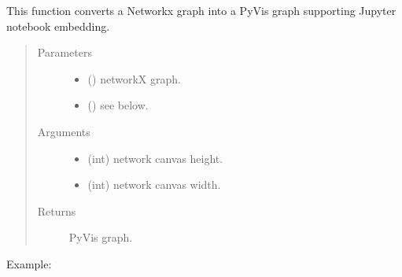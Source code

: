 \documentclass[letterpaper,10pt,english]{sphinxmanual}
\begin{document}
\begin{fulllineitems}
\label{\detokenize{_autosummary/analytics_core.viz:analytics_core.viz.viz.get_notebook_network_pyvis}}
This function converts a Networkx graph into a PyVis graph supporting Jupyter notebook embedding.
\begin{quote}\begin{description}
\item[{Parameters}] \leavevmode\begin{itemize}
\item {} 
 () \textendash{} networkX graph.

\item {} 
 () \textendash{} see below.

\end{itemize}

\item[{Arguments}] \leavevmode\begin{itemize}
\item {} 
 (int) \textendash{} network canvas height.

\item {} 
 (int) \textendash{} network canvas width.

\end{itemize}

\item[{Returns}] \leavevmode
PyVis graph.

\end{description}\end{quote}

Example:

\begin{sphinxVerbatim}[commandchars=\\\{\}]
    
\end{sphinxVerbatim}

\end{fulllineitems}
\end{document}
